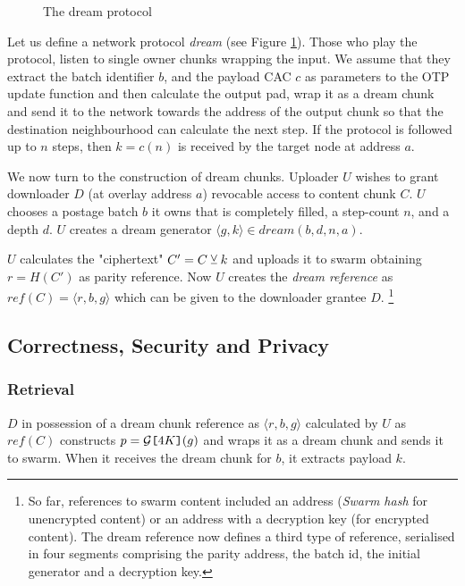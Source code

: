 \begin{figure}[htbp]
  \centering
  \caption{The dream protocol}
\label{fig:protocol}
\end{figure}


Let us  define a network protocol \emph{dream} (see Figure \ref{fig:protocol}). Those who play the protocol, listen to single owner chunks wrapping the input.
We assume that they extract the batch identifier $b$, and the payload CAC $c$ as parameters to the OTP update function and then calculate the output pad, wrap it as a dream chunk and send it to the network towards the address of the output chunk so that the destination neighbourhood 
can calculate the next step. If the protocol is followed up to $n$ steps, then $k=c(n)$ is received by the target node at address $a$. 


We now turn to the construction of dream chunks. 
Uploader $U$ wishes to grant downloader $D$ (at overlay address $a$) revocable  access to content chunk $C$.
$U$  chooses a postage batch $b$ it owns that is completely filled, a step-count $n$, and a depth $d$.
$U$ creates a dream generator $\langle g, k\rangle\in\mathit{dream}(b,d,n,a)$.              

$U$ calculates the "ciphertext" $C'=C \veebar k$ and uploads it to swarm obtaining $r=\mathit{H}(C')$ as parity reference. Now $U$ creates the \emph{dream reference} as $\mathit{ref}(C)=\langle r,b,g\rangle $ which can be given to the downloader grantee $D$.%
%
\footnote{So far, references to swarm content included an address (\emph{Swarm hash} for unencrypted content) or an address with a decryption key (for encrypted content). The dream reference now defines a third type of reference, serialised in four segments comprising the parity address, the batch id, the initial generator and a decryption key.}

\subsection{Correctness, Security and Privacy}

\subsubsection{Retrieval}
$D$ in possession of a dream chunk reference as 
$\langle r,b,g\rangle $ calculated by $U$  as $\mathit{ref}(C)$ constructs $p=\mathcal{G}\texttt{[}\/4K\/\texttt{]}(g)$ and wraps it as a dream chunk and sends it to swarm. When it receives the dream chunk for $b$, it extracts payload $k$.

